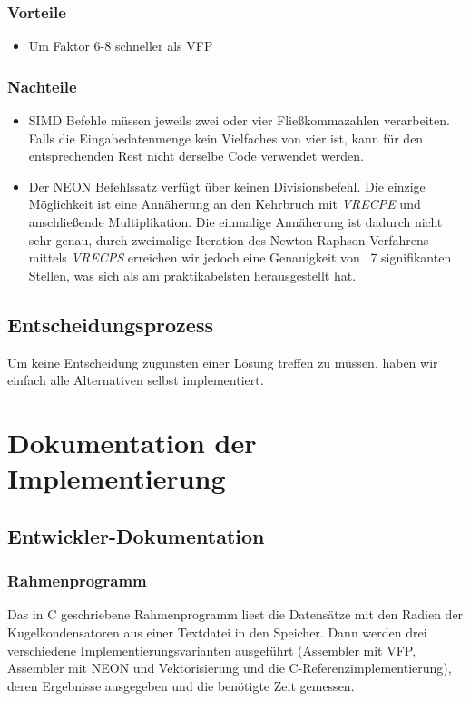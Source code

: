 \documentclass[11pt]{scrartcl}
\begin{document}
\subsubsection{Vorteile}
\begin{itemize}
\item Um Faktor 6-8 schneller als VFP
\end{itemize}
\subsubsection{Nachteile}
\begin{itemize}
\item SIMD Befehle müssen jeweils zwei oder vier Fließkommazahlen verarbeiten. Falls die Eingabedatenmenge kein Vielfaches von vier ist, kann für den entsprechenden Rest nicht derselbe Code verwendet werden.
\item Der NEON Befehlssatz verfügt über keinen Divisionsbefehl. Die einzige Möglichkeit ist eine Annäherung an den Kehrbruch mit \emph{VRECPE} und anschließende Multiplikation. 
Die einmalige Annäherung ist dadurch nicht sehr genau, durch zweimalige Iteration des Newton-Raphson-Verfahrens mittels \emph{VRECPS} erreichen wir jedoch eine Genauigkeit von ~7 signifikanten Stellen, was sich als am praktikabelsten herausgestellt hat. 
\end{itemize}
\subsection{Entscheidungsprozess}
Um keine Entscheidung zugunsten einer Lösung treffen zu müssen, haben wir einfach alle Alternativen selbst implementiert.
\section{Dokumentation der Implementierung}
\subsection{Entwickler-Dokumentation}
\subsubsection{Rahmenprogramm}
Das in C geschriebene Rahmenprogramm liest die Datensätze mit den Radien der Kugelkondensatoren aus einer Textdatei in den Speicher.
Dann werden drei verschiedene Implementierungsvarianten ausgeführt (Assembler mit VFP, Assembler mit NEON und Vektorisierung und die C-Referenzimplementierung), deren Ergebnisse ausgegeben und die benötigte Zeit gemessen.
\end{document}
